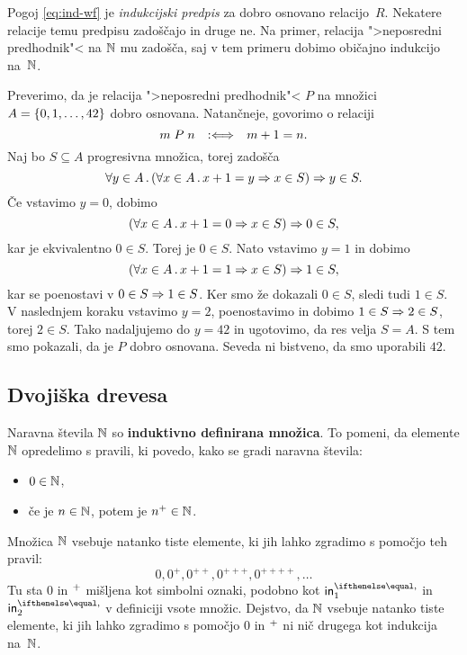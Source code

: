 Pogoj \eqref{eq:ind-wf} je \emph{indukcijski predpis} za dobro osnovano relacijo~$R$. Nekatere relacije temu predpisu zadoščajo in druge ne. Na primer, relacija ">neposredni predhodnik"< na $\mathbb{N}$ mu zadošča, saj v tem primeru dobimo običajno indukcijo na~$\mathbb{N}$.

\begin{zgled}
  Preverimo, da je relacija ">neposredni predhodnik"< $P$ na množici $A = \left\{0, 1, \ldots, 42\right\}$ dobro osnovana.
  Natančneje, govorimo o relaciji
  \begin{equation*}
    m \mathrel{P} n \quad {{:}{\Longleftrightarrow}}\quad m + 1 = n.
  \end{equation*}
  Naj bo $S \subseteq A$ progresivna množica, torej zadošča
  \begin{equation*}
    \forall y \in A \,.\, (\forall x \in A \,.\, x + 1 = y \Rightarrow x \in S) \Rightarrow y \in S.
  \end{equation*}
  Če vstavimo $y = 0$, dobimo
  \begin{equation*}
    (\forall x \in A \,.\, x + 1 = 0 \Rightarrow x \in S) \Rightarrow 0 \in S,
  \end{equation*}
  kar je ekvivalentno $0 \in S$. Torej je $0 \in S$. Nato vstavimo $y = 1$ in dobimo
  \begin{equation*}
    (\forall x \in A \,.\, x + 1 = 1 \Rightarrow x \in S) \Rightarrow 1 \in S,
  \end{equation*}
  kar se poenostavi v $0 \in S \Rightarrow 1 \in S$. Ker smo že dokazali $0 \in S$, sledi tudi $1 \in S$. V naslednjem koraku vstavimo $y = 2$, poenostavimo in dobimo $1 \in S \Rightarrow 2 \in S$, torej $2 \in S$. Tako nadaljujemo do $y = 42$ in ugotovimo, da res velja $S = A$. S tem smo pokazali, da je $P$ dobro osnovana. Seveda ni bistveno, da smo uporabili $42$.
\end{zgled}

\subsection{Dvojiška drevesa}

Naravna števila $\mathbb{N}$ so \textbf{induktivno definirana množica}. To pomeni, da elemente $\mathbb{N}$
opredelimo s pravili, ki povedo, kako se gradi naravna števila:
%
\begin{itemize}
\item $0 \in \mathbb{N}$,
\item če je $n \in \mathbb{N}$, potem je ${n^{+}} \in \mathbb{N}$.
\end{itemize}
%
Množica $\mathbb{N}$ vsebuje natanko tiste elemente, ki jih lahko zgradimo s pomočjo teh pravil:
%
\begin{equation*}
    0, 0^{+}, 0^{++}, 0^{+++}, 0^{++++}, \ldots
\end{equation*}
%
Tu sta $0$ in ${{}^{+}}$ mišljena kot simbolni oznaki, podobno kot $\inl$ in $\inr$ v definiciji vsote množic. Dejstvo,
da $\mathbb{N}$ vsebuje natanko tiste elemente, ki jih lahko zgradimo s pomočjo $0$ in ${{}^{+}}$ ni nič drugega kot indukcija
na~$\mathbb{N}$.

